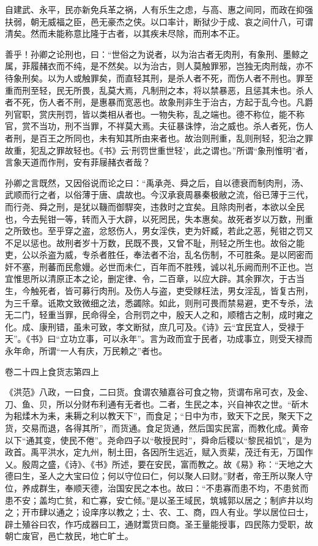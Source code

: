 \documentclass[12pt,UTF8]{ctexbook}
\begin{document}
自建武、永平，民亦新免兵革之祸，人有乐生之虑，与高、惠之间同，而政在抑强扶弱，朝无威福之臣，邑无豪杰之侠。以口率计，断狱少于成、哀之间什八，可谓清矣。然而未能称意比隆于古者，以其疾未尽除，而刑本不正。



善乎！孙卿之论刑也，曰：“世俗之为说者，以为治古者无肉刑，有象刑、墨鲸之属，菲履赭衣而不纯，是不然矣。以为治古，则人莫触罪邪，岂独无肉刑哉，亦不待象刑矣。以为人或触罪矣，而直轻其刑，是杀人者不死，而伤人者不刑也。罪至重而刑至轻，民无所畏，乱莫大焉，凡制刑之本，将以禁暴恶，且惩其未也。杀人者不死，伤人者不刑，是惠暴而宽恶也。故象刑非生于治古，方起于乱今也。凡爵列官职，赏庆刑罚，皆以类相从者也。一物失称，乱之端也。德不称位，能不称官，赏不当功，刑不当罪，不祥莫大焉。夫征暴诛悖，治之威也。杀人者死，伤人者刑，是百王之所同也，未有知其所由来者也。故治则刑重，乱则刑轻，犯治之罪故重，犯乱之罪故轻也。《书》云‘刑罚世重世轻’，此之谓也。”所谓“象刑惟明”者，言象天道而作刑，安有菲屦赭衣者哉？



孙卿之言既然，又因俗说而论之曰：“禹承尧、舜之后，自以德衰而制肉刑，汤、武顺而行之者，以俗薄于唐、虞故也。今汉承衰周暴秦极敝之流，俗已薄于三代，而行尧、舜之刑，是犹以鞿而御駻突，违救时之宜矣。且除肉刑者，本欲以全民也，今去髡钳一等，转而入于大辟，以死罔民，失本惠矣。故死者岁以万数，刑重之所致也。至乎穿之盗，忿怒伤人，男女淫佚，吏为奸臧，若此之恶，髡钳之罚又不足以惩也。故刑者岁十万数，民既不畏，又曾不耻，刑轻之所生也。故俗之能吏，公以杀盗为威，专杀者胜任，奉法者不治，乱名伤制，不可胜条。是以罔密而奸不塞，刑蕃而民愈嫚。必世而未仁，百年而不胜残，诚以礼乐阙而刑不正也。岂宜惟思所以清原正本之论，删定律、令，二百章，以应大辟。其余罪次，于古当生，今触死者，皆可募行肉刑。及伤人与盗，吏受赇枉法，男女淫乱，皆复古刑，为三千章。诋欺文致微细之法，悉蠲除。如此，则刑可畏而禁易避，吏不专杀，法无二门，轻重当罪，民命得全，合刑罚之中，殷天人之和，顺稽古之制，成时雍之化。成、康刑错，虽未可致，孝文断狱，庶几可及。《诗》云“宜民宜人，受禄于天”。《书》曰“立功立事，可以永年”。言为政而宜于民者，功成事立，则受天禄而永年命，所谓“一人有庆，万民赖之”者也。





卷二十四上食货志第四上



《洪范》八政，一曰食，二曰货。食谓农殖嘉谷可食之物，货谓布帛可衣，及金、刀、鱼、贝，所以分财布利通有无者也。二者，生民之本，兴自神农之世。“斫木为耜煣木为耒，耒耨之利以教天下”，而食足；“日中为市，致天下之民，聚天下之货，交易而退，各得其所”，而货通。食足货通，然后国实民富，而教化成。黄帝以下“通其变，使民不倦”。尧命四子以“敬授民时”，舜命后稷以“黎民祖饥”，是为政首。禹平洪水，定九州，制土田，各因所生远近，赋入贡棐，茂迁有无，万国作乂。殷周之盛，《诗》、《书》所述，要在安民，富而教之。故《易》称：“天地之大德曰生，圣人之大宝曰位；何以守位曰仁，何以聚人曰财。”财者，帝王所以聚人守位，养成群生，奉顺天德，治国安民之本也。故曰：“不患寡而患不均，不患贫而患不安；盖均亡贫，和亡寡，安亡倾。”是以圣王域民，筑城郭以居之；制庐井以均之；开市肆以通之；设庠序以教之；士、农、工、商，四人有业。学以居位曰士，辟土殖谷曰农，作巧成器曰工，通财鬻货曰商。圣王量能授事，四民陈力受职，故朝亡废官，邑亡敖民，地亡旷土。
\end{document}
